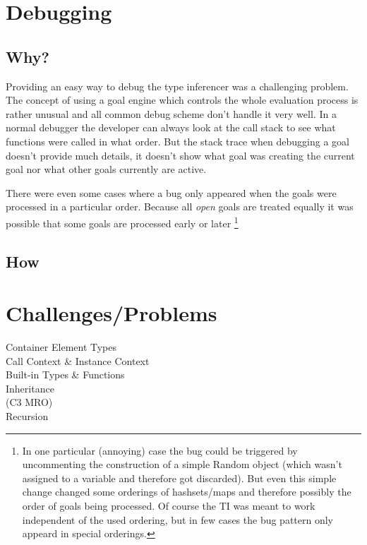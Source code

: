 \documentclass[12pt,halfparskip]{scrreprt}
\begin{document}
\section{Debugging}

\subsection{Why?}

Providing an easy way to debug the type inferencer was a challenging problem. The concept of using a goal engine which controls the whole evaluation process is rather unusual and all common debug scheme don't handle it very well. In a normal debugger the developer can always look at the call stack to see what functions were called in what order. But the stack trace when debugging a goal doesn't provide much details, it doesn't show what goal was creating the current goal nor what other goals currently are active.

There were even some cases where a bug only appeared when the goals were processed in a particular order. Because all \emph{open} goals are treated equally it was possible that some goals are processed early or later
\footnote{In one particular (annoying) case the bug could be triggered by uncommenting the construction of a simple Random object (which wasn't assigned to a variable and therefore got discarded). But even this simple change changed some orderings of hashsets/maps and therefore possibly the order of goals being processed. Of course the TI was meant to work independent of the used ordering, but in few cases the bug pattern only appeard in special orderings.}

\subsection{How}




\section{Challenges/Problems}
Container Element Types \\
Call Context \& Instance Context \\
Built-in Types \& Functions\\
Inheritance\\
 (C3 MRO)\\
Recursion\\
\end{document}
